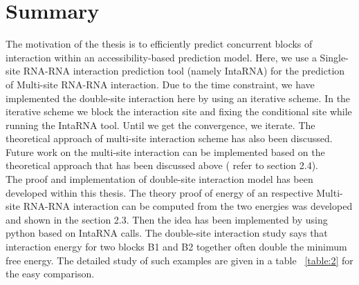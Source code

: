 \documentclass[twoside,a4paper]{report}
\numberwithin{equation}{section}
\begin{document}
	
%	
%	
%	
%	
%	 
%
%
%	  
%	 
%	
%	 
%	 
%	 
	
		\chapter{Summary}
		
	The motivation of the thesis is to efficiently predict concurrent blocks of interaction within an accessibility-based prediction model. Here, we use a Single-site RNA-RNA interaction prediction tool (namely IntaRNA) for the prediction of Multi-site RNA-RNA interaction. Due to the time constraint, we have implemented the double-site interaction here by using an iterative scheme. In the iterative scheme we block the interaction site and fixing the conditional site while running the IntaRNA tool. Until we get the convergence, we iterate. The theoretical approach of multi-site interaction scheme has also been discussed. Future work on the multi-site interaction can be implemented based on the theoretical approach that has been discussed above ( refer to section 2.4). \\
	
	 The proof and implementation of double-site interaction model has been developed within this thesis. The theory proof of energy of an respective Multi-site RNA-RNA interaction can be computed from the two energies was developed and shown in the section 2.3. Then the idea has been implemented by using python based on IntaRNA calls. The double-site interaction study says that interaction energy for two blocks B1 and B2 together often double the minimum free energy. The detailed study of such examples are given in a table ~\ref{table:2} for the easy comparison. \\
	 
\end{document}
